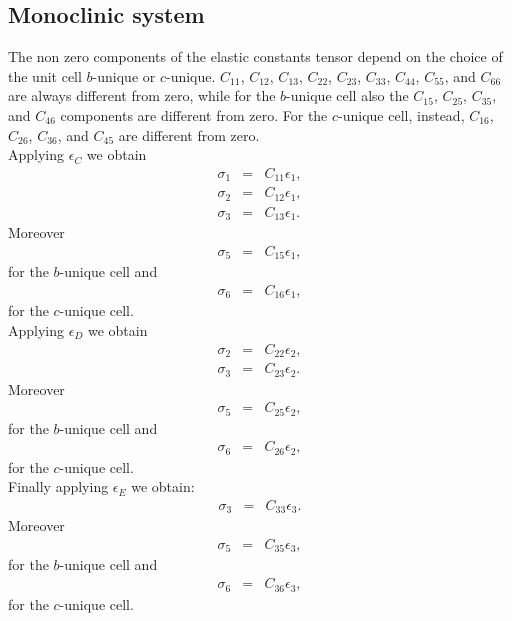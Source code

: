 \documentclass[12pt,a4paper]{article}
\begin{document}
\subsection{\color{web-blue}Monoclinic system}
The non zero components of the elastic constants tensor depend on the choice
of the unit cell $b$-unique or $c$-unique. 
$C_{11}$, $C_{12}$, $C_{13}$, $C_{22}$, $C_{23}$, $C_{33}$, $C_{44}$, 
$C_{55}$, and $C_{66}$ are always different from zero, while for the
$b$-unique cell also the $C_{15}$, $C_{25}$, $C_{35}$, and $C_{46}$ components
are different from zero. For the $c$-unique cell, instead, $C_{16}$, $C_{26}$, 
$C_{36}$, and $C_{45}$ are different from zero. \\
Applying $\epsilon_C$ we obtain
\begin{eqnarray}
\sigma_1&=&C_{11} \epsilon_1,  \\
\sigma_2&=&C_{12} \epsilon_1,  \\
\sigma_3&=&C_{13} \epsilon_1.  
\end{eqnarray}
Moreover
\begin{eqnarray}
\sigma_5&=&C_{15} \epsilon_1,
\end{eqnarray}
for the $b$-unique cell and 
\begin{eqnarray}
\sigma_6&=&C_{16} \epsilon_1,
\end{eqnarray}
for the $c$-unique cell. \\
Applying $\epsilon_D$ we obtain
\begin{eqnarray}
\sigma_2&=&C_{22} \epsilon_2,  \\
\sigma_3&=&C_{23} \epsilon_2.  
\end{eqnarray}
Moreover
\begin{eqnarray}
\sigma_5&=&C_{25} \epsilon_2,
\end{eqnarray}
for the $b$-unique cell and 
\begin{eqnarray}
\sigma_6&=&C_{26} \epsilon_2,
\end{eqnarray}
for the $c$-unique cell. \\
Finally applying $\epsilon_E$ we obtain:
\begin{eqnarray}
\sigma_3&=&C_{33} \epsilon_3.
\end{eqnarray}
Moreover 
\begin{eqnarray}
\sigma_5&=&C_{35} \epsilon_3,
\end{eqnarray}
for the $b$-unique cell and 
\begin{eqnarray}
\sigma_6&=&C_{36} \epsilon_3,
\end{eqnarray}
for the $c$-unique cell. \\
\end{document}
